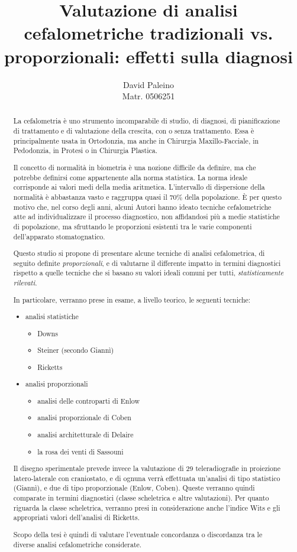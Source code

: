 \documentclass[a4paper,10pt]{article}
\title{Valutazione di analisi cefalometriche tradizionali vs. proporzionali: effetti sulla diagnosi}
\author{
David Paleino\\
\begingroup
\footnotesize
Matr. 0506251
\endgroup
}
\date{}
\begin{document}
\maketitle

\begin{abstract}
La cefalometria è uno strumento incomparabile di studio, di diagnosi, di pianificazione di trattamento e di valutazione della crescita, con o senza trattamento. Essa è principalmente usata in Ortodonzia, ma anche in Chirurgia Maxillo-Facciale, in Pedodonzia, in Protesi o in Chirurgia Plastica.

Il concetto di normalità in biometria è una nozione difficile da definire, ma che potrebbe definirsi come appartenente alla norma statistica. La norma ideale corrisponde ai valori medi della media aritmetica. L’intervallo di dispersione della normalità è abbastanza vasto e raggruppa quasi il 70\% della popolazione. È per questo motivo che, nel corso degli anni, alcuni Autori hanno ideato tecniche cefalometriche atte ad individualizzare il processo diagnostico, non affidandosi più a medie statistiche di popolazione, ma sfruttando le proporzioni esistenti tra le varie componenti dell'apparato stomatognatico.

Questo studio si propone di presentare alcune tecniche di analisi cefalometrica, di seguito definite \emph{proporzionali}, e di valutarne il differente impatto in termini diagnostici rispetto a quelle tecniche che si basano su valori ideali comuni per tutti, \emph{statisticamente rilevati}.

In particolare, verranno prese in esame, a livello teorico, le seguenti tecniche:
\begin{itemize}
\item analisi statistiche
\begin{itemize}
\item Downs
\item Steiner (secondo Giannì)
\item Ricketts
\end{itemize}
\item analisi proporzionali
\begin{itemize}
\item analisi delle controparti di Enlow
\item analisi proporzionale di Coben
\item analisi architetturale di Delaire
\item la rosa dei venti di Sassouni
\end{itemize}
\end{itemize}

Il disegno sperimentale prevede invece la valutazione di 29 teleradiografie in proiezione latero-laterale con craniostato, e di ognuna verrà effettuata un'analisi di tipo statistico (Giannì), e due di tipo proporzionale (Enlow, Coben). Queste verranno quindi comparate in termini diagnostici (classe scheletrica e altre valutazioni). Per quanto riguarda la classe scheletrica, verranno presi in considerazione anche l'indice Wits e gli appropriati valori dell'analisi di Ricketts.

Scopo della tesi è quindi di valutare l'eventuale concordanza o discordanza tra le diverse analisi cefalometriche considerate.
\end{abstract}
\end{document}
